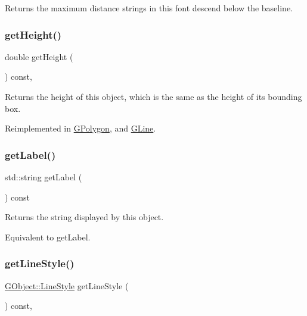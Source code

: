 Returns the maximum distance strings in this font descend below the baseline. 

\mbox{\label{classGObject_a1e7e353362434072875264cf95629f99}} 
\subsubsection{\texorpdfstring{get\+Height()}{getHeight()}}
{\footnotesize\ttfamily double get\+Height (\begin{DoxyParamCaption}{ }\end{DoxyParamCaption}) const\hspace{0.3cm}{\ttfamily [virtual]}, {\ttfamily [inherited]}}



Returns the height of this object, which is the same as the height of its bounding box. 



Reimplemented in \mbox{\hyperlink{classGPolygon_a1e7e353362434072875264cf95629f99}{G\+Polygon}}, and \mbox{\hyperlink{classGLine_a423f17d4aeb66feb0d148fd23af335b7}{G\+Line}}.

\mbox{\label{classGText_aa73aa351564b091c0658f2368c6d5c5f}} 
\subsubsection{\texorpdfstring{get\+Label()}{getLabel()}}
{\footnotesize\ttfamily std\+::string get\+Label (\begin{DoxyParamCaption}{ }\end{DoxyParamCaption}) const\hspace{0.3cm}{\ttfamily [virtual]}}



Returns the string displayed by this object. 

Equivalent to get\+Label. \mbox{\label{classGObject_aaf1f5ea8281e5e3486662878d26f0a13}} 
\subsubsection{\texorpdfstring{get\+Line\+Style()}{getLineStyle()}}
{\footnotesize\ttfamily \mbox{\hyperlink{classGObject_a86e0f5648542856159bb40775c854aa7}{G\+Object\+::\+Line\+Style}} get\+Line\+Style (\begin{DoxyParamCaption}{ }\end{DoxyParamCaption}) const\hspace{0.3cm}{\ttfamily [virtual]}, {\ttfamily [inherited]}}



